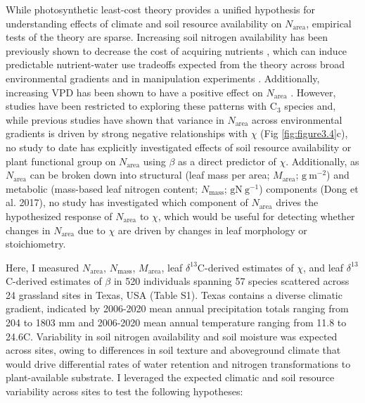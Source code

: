 While photosynthetic least-cost theory provides a unified hypothesis for understanding effects of climate and soil resource availability on $N_\mathrm{area}$, empirical tests of the theory are sparse. Increasing soil nitrogen availability has been previously shown to decrease the cost of acquiring nutrients , which can induce predictable nutrient-water use tradeoffs expected from the theory across broad environmental gradients  and in manipulation experiments . Additionally, increasing VPD has been shown to have a positive effect on $N_\mathrm{area}$ . However, studies have been restricted to exploring these patterns with C$_3$ species and, while previous studies have shown that variance in $N_\mathrm{area}$ across environmental gradients is driven by strong negative relationships with $\chi$ (Fig \ref{fig:figure3.4}c), no study to date has explicitly investigated effects of soil resource availability or plant functional group on $N_\mathrm{area}$ using $\beta$ as a direct predictor of $\chi$. Additionally, as $N_\mathrm{area}$ can be broken down into structural (leaf mass per area; $M_\mathrm{area}$; $\mathrm{g\ m^{-2}}$) and metabolic (mass-based leaf nitrogen content; $N_\mathrm{mass}$; $\mathrm{g N\ g^{-1}}$) components (Dong et al. 2017), no study has investigated which component of $N_\mathrm{area}$ drives the hypothesized response of $N_\mathrm{area}$ to $\chi$, which would be useful for detecting whether changes in $N_\mathrm{area}$ due to $\chi$ are driven by changes in leaf morphology or stoichiometry.

Here, I measured $N_\mathrm{area}$, $N_\mathrm{mass}$, $M_\mathrm{area}$, leaf $\delta^{13}$C-derived estimates of $\chi$, and leaf $\delta^{13}$C-derived estimates of $\beta$ in 520 individuals spanning 57 species scattered across 24 grassland sites in Texas, USA (Table S1). Texas contains a diverse climatic gradient, indicated by 2006-2020 mean annual precipitation totals ranging from 204 to 1803 mm and 2006-2020 mean annual temperature ranging from 11.8\textdegree{} to 24.6\textdegree{}C. Variability in soil nitrogen availability and soil moisture was expected across sites, owing to differences in soil texture and aboveground climate that would drive differential rates of water retention and nitrogen transformations to plant-available substrate. I leveraged the expected climatic and soil resource variability across sites to test the following hypotheses:


